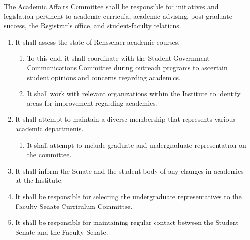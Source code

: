 \item The Academic Affairs Committee shall be responsible for initiatives and legislation pertinent to academic curricula, academic
advising, post-graduate success, the Registrar’s office, and student-faculty relations.
\begin{enumerate}
    \item It shall assess the state of Rensselaer academic courses.
    \begin{enumerate}
        \item To this end, it shall coordinate with the Student Government Communications Committee during outreach programs
        to ascertain student opinions and concerns regarding academics.

        \item It shall work with relevant organizations within the Institute to identify areas for improvement regarding academics.
    \end{enumerate}

    \item It shall attempt to maintain a diverse membership that represents various academic departments.
    \begin{enumerate}
        \item It shall attempt to include graduate and undergraduate representation on the committee.
    \end{enumerate}

    \item It shall inform the Senate and the student body of any changes in academics at the Institute.

    \item It shall be responsible for selecting the undergraduate representatives to the Faculty Senate Curriculum Committee.

    \item It shall be responsible for maintaining regular contact between the Student Senate and the Faculty Senate.
\end{enumerate}

